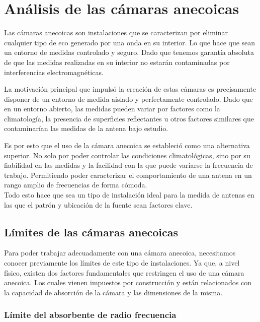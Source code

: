 \documentclass{article}
\begin{document}
\newpage

\section{Análisis de las cámaras anecoicas}

Las cámaras anecoicas son instalaciones que se caracterizan por eliminar cualquier tipo de eco generado por una onda en su interior. Lo que hace que sean un entorno de medidas controlado y seguro. Dado que tenemos garantía absoluta de que las medidas realizadas en su interior no estarán contaminadas por interferencias electromagnéticas.

La motivación principal que impulsó la creación de estas cámaras es precisamente disponer de un entorno de medida aislado y perfectamente controlado. Dado que en un entorno abierto, las medidas pueden variar por factores como la climatología, la presencia de superficies reflectantes u otros factores similares que contaminarían las medidas de la antena bajo estudio. 

Es por esto que el uso de la cámara anecoica se estableció como una alternativa superior. No solo por poder controlar las condiciones climatológicas, sino por su fiabilidad en las medidas y la facilidad con la que puede variarse la frecuencia de trabajo. Permitiendo poder caracterizar el comportamiento de una antena en un rango amplio de frecuencias de forma cómoda.\\
Todo esto hace que sea un tipo de instalación ideal para la medida de antenas en las que el patrón y ubicación de la fuente sean factores clave. 

\subsection{Límites de las cámaras anecoicas}

Para poder trabajar adecuadamente con una cámara anecoica, necesitamos conocer previamente los límites de este tipo de instalaciones. Ya que, a nivel físico, existen dos factores fundamentales que restringen el uso de una cámara anecoica. Los cuales vienen impuestos por construcción y están relacionados con la capacidad de absorción de la cámara y las dimensiones de la misma. 

\subsubsection{Límite del absorbente de radio frecuencia }
\end{document}
